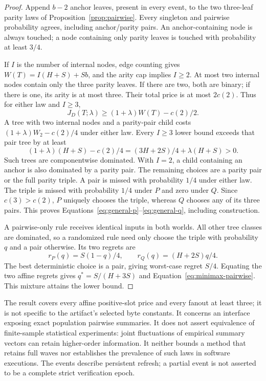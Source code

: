 \begin{proof}
Append $b-2$ anchor leaves, present in every event, to the two three-leaf
parity laws of Proposition~\ref{prop:pairwise}. Every singleton and pairwise
probability agrees, including anchor/parity pairs. An anchor-containing
node is always touched; a node containing only parity leaves is touched
with probability at least $3/4$.

If $I$ is the number of internal nodes, edge counting gives
$W(T)=I(H+S)+Sb$, and the arity cap implies $I\ge2$.
At most two internal nodes contain only the three parity leaves. If there
are two, both are binary; if there is one, its arity is at most three.
Their total price is at most $2c(2)$. Thus for either law and $I\ge3$,
\[
 J_D(T;\lambda)\ge(1+\lambda)W(T)-c(2)/2.
\]
A tree with two internal nodes and a parity-pair child costs
$(1+\lambda)W_2-c(2)/4$ under either law. Every $I\ge3$ lower bound exceeds
that pair tree by at least
\[
 (1+\lambda)(H+S)-c(2)/4
 = (3H+2S)/4+\lambda(H+S)>0.
\]
Such trees are componentwise dominated. With $I=2$, a child containing an
anchor is also dominated by a parity pair. The remaining choices are a
parity pair or the full parity triple. A pair is missed with probability
$1/4$ under either law. The triple is missed with probability $1/4$ under
$P$ and zero under $Q$. Since $c(3)>c(2)$, $P$ uniquely chooses the triple,
whereas $Q$ chooses any of its three pairs. This proves
Equations~\eqref{eq:general-p}--\eqref{eq:general-q}, including construction.

A pairwise-only rule receives identical inputs in both worlds. All other
tree classes are dominated, so a randomized rule need only choose the triple
with probability $q$ and a pair otherwise. Its two regrets are
\[
 r_P(q)=S(1-q)/4,\qquad r_Q(q)=(H+2S)q/4.
\]
The best deterministic choice is a pair, giving worst-case regret $S/4$.
Equating the two affine regrets gives $q^*=S/(H+3S)$ and
Equation~\eqref{eq:minimax-pairwise}. This mixture attains the lower bound.
\end{proof}

The result covers every affine positive-slot price and every fanout at least
three; it is not specific to the artifact's selected byte constants. It
concerns an interface exposing exact population pairwise summaries.
It does not assert equivalence of finite-sample statistical experiments:
joint fluctuations of empirical summary vectors can retain higher-order
information. It neither bounds a method
that retains full waves nor establishes the prevalence of such laws in
software executions. The events describe persistent refresh; a partial
event is not asserted to be a complete strict verification epoch.

